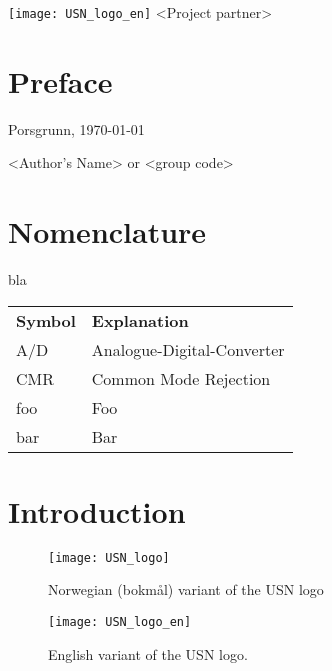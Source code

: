 \documentclass[%
]{USN-MSc}
\newcommand{\myauthor}{%
<Author's Name> or <group code>
}
\newcommand{\myparticipants}{
<First participant>\\
<Second participant>\\
<Third participant>\\
<Fourth participant>
}
\begin{document}
\USNtitlepage%
{%
  {}
   \texttt{[image: USN\_logo\_en]}}
{<Project partner>}
{%
\lipsum[6-7]
}

\chapter*{Preface}
\label{sec:preface}
\lipsum[1-3]
\bigskip
Porsgrunn, \today

\myauthor %


\tableofcontents
{}

\listoffigures %

\listoftables  %

\chapter*{Nomenclature}
\label{sec:nomenclature}
bla

\begin{longtable}{ll}
  \textbf{Symbol} & \textbf{Explanation}\endhead\\
  A/D	& Analogue-Digital-Converter \\
  CMR	& Common Mode Rejection \\
  foo	& Foo \\
  bar 	& Bar
\end{longtable}

\chapter{Introduction}
\label{ch:intro}
\lipsum[4]
\begin{figure}[!ht]
  \centering
  \texttt{[image: USN\_logo]}
  \caption{Norwegian (bokmål) variant of the USN logo}
  \label{fig:usn-logo}
\end{figure}
\lipsum[4]
\begin{figure}[!ht]
  \centering
  \texttt{[image: USN\_logo\_en]}
  \caption{English variant of the USN logo.}
  \label{fig:usn-logo-en}
\end{figure}
\lipsum
\end{document}
